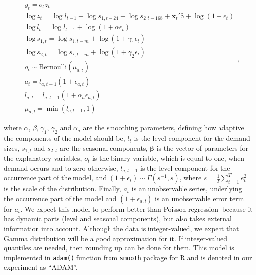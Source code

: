 \documentclass[]{elsarticle} %
\begin{document}
\begin{equation}
    \begin{aligned}
      & y_t = o_t z_t \\
        & \log z_t = \log l_{t-1} + \log s_{1,t-24} + \log s_{2,t-168} + \mathbf{x}_t' \boldsymbol{\beta} + \log \left(1 + \epsilon_{t} \right) \\
        & \log l_{t} = \log l_{t-1} + \log( 1  + \alpha \epsilon_{t}) \\ 
        & \log s_{1,t} = \log s_{1,t-m} + \log( 1  + \gamma_1 \epsilon_{t}) \\
        & \log s_{2,t} = \log s_{2,t-m} + \log( 1  + \gamma_2 \epsilon_{t}) \\
        & o_t \sim \text{Bernoulli} \left(\mu_{a,t} \right) \\
        & a_t = l_{a,t-1} \left(1 + \epsilon_{a,t} \right) \\
        & l_{a,t} = l_{a,t-1}( 1  + \alpha_{a} \epsilon_{a,t}) \\
        & \mu_{a,t} = \min(l_{a,t-1}, 1)
    \end{aligned} ,
    \label{eq:ADAMModel}
\end{equation}

where \(\alpha\), \(\beta\), \(\gamma_1\), \(\gamma_2\) and \(\alpha_a\) are the smoothing parameters, defining how adaptive the components of the model should be, \(l_t\) is the level component for the demand sizes, \(s_{1,t}\) and \(s_{2,t}\) are the seasonal components, \(\boldsymbol{\beta}\) is the vector of parameters for the explanatory variables, \(o_t\) is the binary variable, which is equal to one, when demand occurs and to zero otherwise, \(l_{a,t-1}\) is the level component for the occurrence part of the model, and \(\left(1+\epsilon_t \right) \sim \mathcal{\Gamma}(s^{-1}, s)\), where \(s=\frac{1}{T} \sum_{t=1}^{T} e_{t}^2\) is the scale of the distribution. Finally, \(a_t\) is an unobservable series, underlying the occurrence part of the model and \((1 + \epsilon_{a,t})\) is an unobservable error term for \(a_t\). We expect this model to perform better than Poisson regression, because it has dynamic parts (level and seasonal components), but also takes external information into account. Although the data is integer-valued, we expect that Gamma distribution will be a good approximation for it. If integer-valued quantiles are needed, then rounding up can be done for them. This model is implemented in \texttt{adam()} function from \texttt{smooth} package \citep{Svetunkov2021Smooth} for R and is denoted in our experiment as ``ADAM''.
\end{document}
